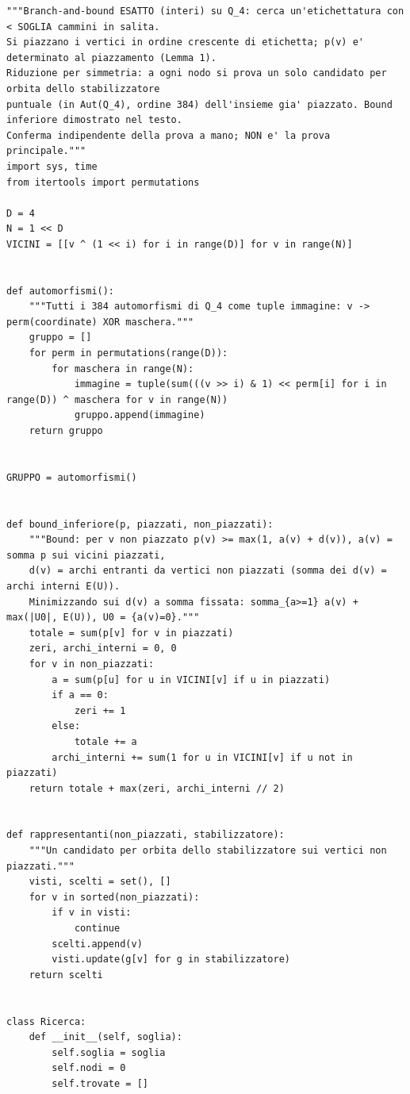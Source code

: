 \documentclass[11pt,a4paper]{article}
\begin{document}
\begin{lstlisting}[caption={certificati/q4\_branch\_and\_bound.py}]
"""Branch-and-bound ESATTO (interi) su Q_4: cerca un'etichettatura con < SOGLIA cammini in salita.
Si piazzano i vertici in ordine crescente di etichetta; p(v) e' determinato al piazzamento (Lemma 1).
Riduzione per simmetria: a ogni nodo si prova un solo candidato per orbita dello stabilizzatore
puntuale (in Aut(Q_4), ordine 384) dell'insieme gia' piazzato. Bound inferiore dimostrato nel testo.
Conferma indipendente della prova a mano; NON e' la prova principale."""
import sys, time
from itertools import permutations

D = 4
N = 1 << D
VICINI = [[v ^ (1 << i) for i in range(D)] for v in range(N)]


def automorfismi():
    """Tutti i 384 automorfismi di Q_4 come tuple immagine: v -> perm(coordinate) XOR maschera."""
    gruppo = []
    for perm in permutations(range(D)):
        for maschera in range(N):
            immagine = tuple(sum(((v >> i) & 1) << perm[i] for i in range(D)) ^ maschera for v in range(N))
            gruppo.append(immagine)
    return gruppo


GRUPPO = automorfismi()


def bound_inferiore(p, piazzati, non_piazzati):
    """Bound: per v non piazzato p(v) >= max(1, a(v) + d(v)), a(v) = somma p sui vicini piazzati,
    d(v) = archi entranti da vertici non piazzati (somma dei d(v) = archi interni E(U)).
    Minimizzando sui d(v) a somma fissata: somma_{a>=1} a(v) + max(|U0|, E(U)), U0 = {a(v)=0}."""
    totale = sum(p[v] for v in piazzati)
    zeri, archi_interni = 0, 0
    for v in non_piazzati:
        a = sum(p[u] for u in VICINI[v] if u in piazzati)
        if a == 0:
            zeri += 1
        else:
            totale += a
        archi_interni += sum(1 for u in VICINI[v] if u not in piazzati)
    return totale + max(zeri, archi_interni // 2)


def rappresentanti(non_piazzati, stabilizzatore):
    """Un candidato per orbita dello stabilizzatore sui vertici non piazzati."""
    visti, scelti = set(), []
    for v in sorted(non_piazzati):
        if v in visti:
            continue
        scelti.append(v)
        visti.update(g[v] for g in stabilizzatore)
    return scelti


class Ricerca:
    def __init__(self, soglia):
        self.soglia = soglia
        self.nodi = 0
        self.trovate = []


\end{lstlisting}
\end{document}
